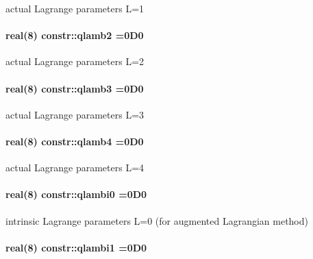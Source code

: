 actual Lagrange parameters L=1 

\paragraph[{\texorpdfstring{qlamb2}{qlamb2}}]{\setlength{\rightskip}{0pt plus 5cm}real(8) constr\+::qlamb2 =0\+D0}\hypertarget{namespaceconstr_a9ca0a1590d9f556ff216f87edce932aa}{}\label{namespaceconstr_a9ca0a1590d9f556ff216f87edce932aa}


actual Lagrange parameters L=2 

\paragraph[{\texorpdfstring{qlamb3}{qlamb3}}]{\setlength{\rightskip}{0pt plus 5cm}real(8) constr\+::qlamb3 =0\+D0}\hypertarget{namespaceconstr_add50840d9e3f3339a914faf7021b4ed8}{}\label{namespaceconstr_add50840d9e3f3339a914faf7021b4ed8}


actual Lagrange parameters L=3 

\paragraph[{\texorpdfstring{qlamb4}{qlamb4}}]{\setlength{\rightskip}{0pt plus 5cm}real(8) constr\+::qlamb4 =0\+D0}\hypertarget{namespaceconstr_a75f9086ecf6dfa3e0112d61c7238d08e}{}\label{namespaceconstr_a75f9086ecf6dfa3e0112d61c7238d08e}


actual Lagrange parameters L=4 

\paragraph[{\texorpdfstring{qlambi0}{qlambi0}}]{\setlength{\rightskip}{0pt plus 5cm}real(8) constr\+::qlambi0 =0\+D0}\hypertarget{namespaceconstr_a17954f7fbd341fdc4cca55cefe24fb51}{}\label{namespaceconstr_a17954f7fbd341fdc4cca55cefe24fb51}


intrinsic Lagrange parameters L=0 (for augmented Lagrangian method) 

\paragraph[{\texorpdfstring{qlambi1}{qlambi1}}]{\setlength{\rightskip}{0pt plus 5cm}real(8) constr\+::qlambi1 =0\+D0}\hypertarget{namespaceconstr_a141f76999ff788fc33f775e86437ceb3}{}\label{namespaceconstr_a141f76999ff788fc33f775e86437ceb3}


